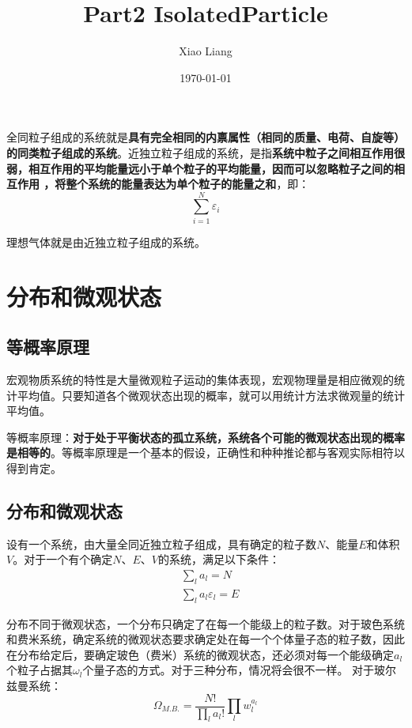 \documentclass[UTF8]{ctexart}
\title{Part2 IsolatedParticle}
\author{Xiao Liang}
\date{\today}
\newcommand{\firstsection}{\subsection}
\newcommand{\backdoc}{\normalsize}
\begin{document}
	\maketitle
	\tableofcontents
	\newpage
	
	全同粒子组成的系统就是\textbf{具有完全相同的内禀属性（相同的质量、电荷、自旋等）的同类粒子组成的系统}。近独立粒子组成的系统，是指\textbf{系统中粒子之间相互作用很弱，相互作用的平均能量远小于单个粒子的平均能量，因而可以忽略粒子之间的相互作用 ，将整个系统的能量表达为单个粒子的能量之和}，即：
	\begin{equation}
		\sum_{i=1}^{N} \varepsilon_{i}
	\end{equation}
	
	理想气体就是由近独立粒子组成的系统。
	
	\section{分布和微观状态}
	\firstsection{等概率原理}
	
	\backdoc
	宏观物质系统的特性是大量微观粒子运动的集体表现，宏观物理量是相应微观的统计平均值。只要知道各个微观状态出现的概率，就可以用统计方法求微观量的统计平均值。
	
	等概率原理：\textbf{对于处于平衡状态的孤立系统，系统各个可能的微观状态出现的概率是相等的}。等概率原理是一个基本的假设，正确性和种种推论都与客观实际相符以得到肯定。
	
	\firstsection{分布和微观状态}
	
	\backdoc
	设有一个系统，由大量全同近独立粒子组成，具有确定的粒子数$ N $、能量$ E $和体积$ V $。对于一个有个确定$ N $、$ E $、$ V $的系统，满足以下条件：
	\begin{equation}
	\begin{aligned}
		&\sum_{l} a_{l}=N \\
		&\sum_{l} a_{l}\varepsilon_{l}=E
	\end{aligned}
	\end{equation}
	
	分布不同于微观状态，一个分布只确定了在每一个能级上的粒子数。对于玻色系统和费米系统，确定系统的微观状态要求确定处在每一个个体量子态的粒子数，因此在分布给定后，要确定玻色（费米）系统的微观状态，还必须对每一个能级确定$ a_{l} $个粒子占据其$ \omega_{l} $个量子态的方式。对于三种分布，情况将会很不一样。
	对于玻尔兹曼系统：
	\begin{equation}
		\Omega_{M.B.}=\frac{N !}{\prod_{l} a_{l} !} \prod_{l} w_{l}^{a_{l}}
	\end{equation}
	
\end{document}
